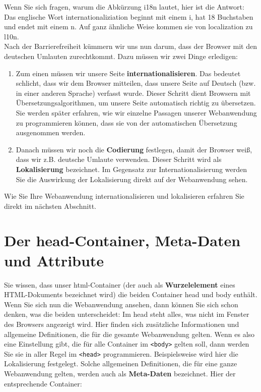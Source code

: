 Wenn Sie sich fragen, warum die Abkürzung i18n lautet, hier ist die Antwort: Das englische Wort internationaliziation beginnt mit einem i, hat 18 Buchstaben und endet mit einem n. Auf ganz ähnliche Weise kommen sie von localization zu l10n.\\

Nach der Barrierefreiheit kümmern wir uns nun darum, dass der Browser mit den deutschen Umlauten zurechtkommt. Dazu müssen wir zwei Dinge erledigen:

\begin{enumerate}
	\item Zum einen müssen wir unsere Seite \textbf{internationalisieren}. Das bedeutet schlicht, dass wir dem Browser mitteilen, dass unsere Seite auf Deutsch (bzw. in einer anderen Sprache) verfasst wurde. Dieser Schritt dient Browsern mit Übersetzungsalgorithmen, um unsere Seite automatisch \glqq{}richtig\grqq{} zu übersetzen. Sie werden später erfahren, wie wir einzelne Passagen unserer Webanwendung zu programmieren können, dass sie von der automatischen Übersetzung ausgenommen werden.
	\item Danach müssen wir noch die \textbf{Codierung} festlegen, damit der Browser weiß, dass wir z.B. deutsche Umlaute verwenden. Dieser Schritt wird als \textbf{Lokalisierung} bezeichnet. Im Gegensatz zur Internationalisierung werden Sie die Auswirkung der Lokalisierung direkt auf der Webanwendung sehen.	
\end{enumerate}

Wie Sie Ihre Webanwendung internationalisieren und lokalisieren erfahren Sie direkt im nächsten Abschnitt.

\section{Der head-Container, Meta-Daten und Attribute}

Sie wissen, dass unser html-Container (der auch als \textbf{Wurzelelement} eines HTML-Dokuments bezeichnet wird) die beiden Container head und body enthält. Wenn Sie sich nun die Webanwendung ansehen, dann können Sie sich schon denken, was die beiden unterscheidet: Im head steht alles, was nicht im Fenster des Browsers angezeigt wird. Hier finden sich zusätzliche Informationen und allgemeine Definitionen, die für die gesamte Webanwendung gelten. Wenn es also eine Einstellung gibt, die für alle Container im \verb|<body>| gelten soll, dann werden Sie sie in aller Regel im \verb|<head>| programmieren. Beispielsweise wird hier die Lokalisierung festgelegt. Solche allgemeinen Definitionen, die für eine ganze Webanwendung gelten, werden auch als \textbf{Meta-Daten} bezeichnet. Hier der entsprechende Container:

